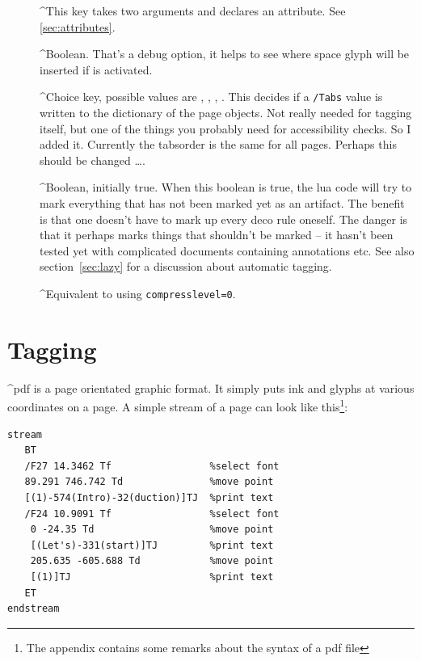 \documentclass[DIV=12,parskip=half-,bibliography=totoc]{scrartcl}
\begin{document}
\begin{description}
\item[]
 \TagP^This key takes two arguments and declares an attribute. See \ref{sec:attributes}.\Pmeti
\item[]
\TagP^Boolean. That's a debug option, it helps to see where space glyph will be inserted if  is activated.\Pmeti
\item[]
 \TagP^Choice key, possible values are , , , .  This decides if a \verb+/Tabs+ value is written to the dictionary of the page objects. Not really needed for tagging itself, but one of the things you probably need for accessibility checks. So I added it. Currently the tabsorder is the same for all pages. Perhaps this should be changed \ldots.\Pmeti
\item[]
 \TagP^Boolean, initially true. When this boolean is true, the lua code will try to mark everything that has not been marked yet as an artifact. The benefit is that one doesn't have to mark up every deco rule oneself. The danger is that it perhaps marks things that shouldn't be marked -- it hasn't been tested yet with complicated documents containing annotations etc. See also section~\ref{sec:lazy} for a discussion about automatic tagging.\Pmeti
\item[]
 \TagP^Equivalent to using \texttt{compresslevel=0}.\Pmeti


\end{description}


\section{Tagging}

\TagP^pdf is a page orientated graphic format. It simply puts ink and glyphs at various coordinates on a page. A simple stream of a page can look like this\footnote{The appendix contains some remarks about the syntax of a pdf file}:
\TagPend

\begin{lstlisting}[columns=fixed]
stream
   BT
   /F27 14.3462 Tf                 %select font
   89.291 746.742 Td               %move point
   [(1)-574(Intro)-32(duction)]TJ  %print text
   /F24 10.9091 Tf                 %select font
    0 -24.35 Td                    %move point
    [(Let's)-331(start)]TJ         %print text
    205.635 -605.688 Td            %move point
    [(1)]TJ                        %print text
   ET
endstream
\end{lstlisting}
\tagmcend\tagstructend
\end{document}
